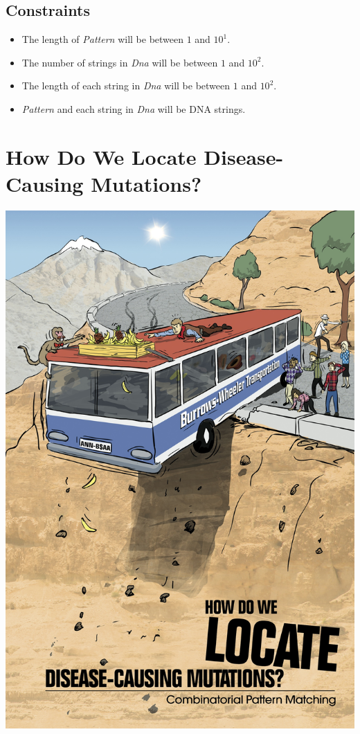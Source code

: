 \documentclass{article}
\begin{document}
\subsection*{Constraints}
\begin{itemize}
    \item The length of \emph{Pattern} will be between $1$ and $10^1$.
    \item The number of strings in \emph{Dna} will be between $1$ and $10^2$.
    \item The length of each string in \emph{Dna} will be between $1$ and $10^2$.
    \item \emph{Pattern} and each string in \emph{Dna} will be DNA strings.
\end{itemize}
\pagebreak

\section{How Do We Locate Disease-Causing Mutations?\\ }
\begin{center}
    \includegraphics[scale=0.72]{c9/c9.jpg}
\end{center}
\pagebreak
\end{document}
